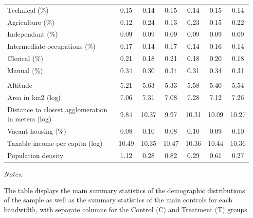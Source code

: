 \begin{table}[!h]
{\begin{threeparttable}
\begin{tabular}[t]{lcccccc}
\hspace{1em}\hspace{1em}\hspace{1em}Technical (\%) & 0.15 & 0.14 & 0.15 & 0.14 & 0.15 & 0.14\\
\hspace{1em}\hspace{1em}Agriculture (\%) & 0.12 & 0.24 & 0.13 & 0.23 & 0.15 & 0.22\\
\hspace{1em}\hspace{1em}Independant (\%) & 0.09 & 0.09 & 0.09 & 0.09 & 0.09 & 0.09\\
\hspace{1em}\hspace{1em}Intermediate occupations (\%) & 0.17 & 0.14 & 0.17 & 0.14 & 0.16 & 0.14\\
\hspace{1em}\hspace{1em}Clerical (\%) & 0.21 & 0.18 & 0.21 & 0.18 & 0.20 & 0.18\\
\hspace{1em}\hspace{1em}Manual (\%) & 0.34 & 0.30 & 0.34 & 0.31 & 0.34 & 0.31\\
\addlinespace[0.3em]
\multicolumn{7}{l}{\textit{Geography}}\\
\hspace{1em}\hspace{1em}Altitude & 5.21 & 5.63 & 5.33 & 5.58 & 5.40 & 5.54\\
\hspace{1em}\hspace{1em}Area in km2 (log) & 7.06 & 7.31 & 7.08 & 7.28 & 7.12 & 7.26\\
\hspace{1em}\hspace{1em}Distance to closest agglomeration in meters (log) & 9.84 & 10.37 & 9.97 & 10.31 & 10.09 & 10.27\\
\hspace{1em}Vacant housing (\%) & 0.08 & 0.10 & 0.08 & 0.10 & 0.09 & 0.10\\
\hspace{1em}Taxable income per capita  (log) & 10.49 & 10.35 & 10.47 & 10.36 & 10.44 & 10.36\\
\hspace{1em}Population density & 1.12 & 0.28 & 0.82 & 0.29 & 0.61 & 0.27\\
\bottomrule
\end{tabular}
\begin{tablenotes}[para]
\item \textit{Notes:} 
\item The table displays the main summary statistics of the demographic distributions of the sample as well as the summary statistics of the main controls for each bandwidth, with separate columns for the Control (C) and Treatment (T) groups.
\end{tablenotes}
\end{threeparttable}}
\end{table}
